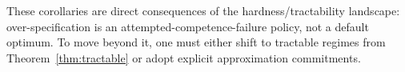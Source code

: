 These corollaries are direct consequences of the hardness/tractability landscape: over-specification is an attempted-competence-failure policy, not a default optimum. To move beyond it, one must either shift to tractable regimes from Theorem~\ref{thm:tractable} or adopt explicit approximation commitments.

